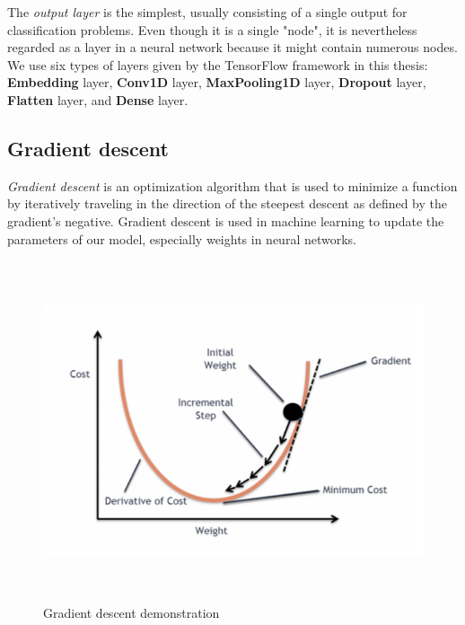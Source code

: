 The \emph{output layer} is the simplest, usually consisting of a single output for classification problems. Even though it is a single "node", it is nevertheless regarded as a layer in a neural network because it might contain numerous nodes. We use six types of layers given by the TensorFlow framework in this thesis: \textbf{Embedding} layer, \textbf{Conv1D} layer, \textbf{MaxPooling1D} layer, \textbf{Dropout} layer, \textbf{Flatten} layer, and \textbf{Dense} layer.
\newpage
\subsection{Gradient descent}
\label{subsec:gradient_descent}
\emph{Gradient descent} is an optimization algorithm that is used to minimize a function by iteratively traveling in the direction of the steepest descent as defined by the gradient's negative. Gradient descent is used in machine learning to update the parameters of our model, especially weights in neural networks.
\begin{figure}[!h]
	\centering
	\includegraphics[width=\linewidth, height=10cm,keepaspectratio]{figures/gradient descent.png}
   \caption{Gradient descent demonstration}
\end{figure}
